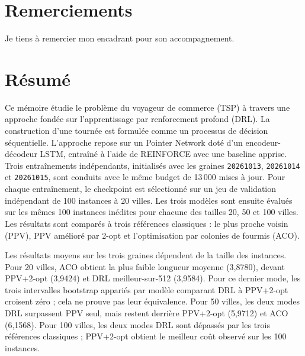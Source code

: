 \documentclass[12pt, a4paper, twoside, openright]{book}
\begin{document}
	\chapter*{Remerciements}
	\pagestyle{plain}
	Je tiens à remercier mon encadrant pour son accompagnement.
	\cleardoublepage
	
\chapter*{R\'esum\'e}

\begin{tcolorbox}[
enhanced,
colback=ThBlue!5,
colframe=ThBlue,
boxsep=2mm,
left=2mm,
right=2mm,
top=1mm,
bottom=1mm,
fontupper=\small,
]
Ce mémoire étudie le problème du voyageur de commerce (TSP) à travers
une approche fondée sur l'apprentissage par renforcement profond (DRL).
La construction d'une tournée est formulée comme un processus de décision
séquentielle. L'approche repose sur un Pointer Network doté d'un
encodeur-décodeur LSTM, entraîné à l'aide de REINFORCE avec une baseline
apprise. Trois entraînements indépendants, initialisés avec les graines
\texttt{20261013}, \texttt{20261014} et \texttt{20261015}, sont conduits
avec le même budget de 13\,000 mises à jour. Pour chaque entraînement,
le checkpoint est sélectionné sur un jeu de validation indépendant de
100 instances à 20 villes. Les trois modèles sont ensuite évalués sur les
mêmes 100 instances inédites pour chacune des tailles 20, 50 et 100 villes.
Les résultats sont comparés à trois références classiques : le plus proche
voisin (PPV), PPV amélioré par 2-opt et l'optimisation par colonies de
fourmis (ACO).

Les résultats moyens sur les trois graines dépendent de la taille des
instances. Pour 20 villes, ACO obtient la plus faible longueur moyenne
(3,8780), devant PPV+2-opt (3,9424) et DRL meilleur-sur-512 (3,9584).
Pour ce dernier mode, les trois intervalles bootstrap appariés par modèle
comparant DRL à PPV+2-opt croisent zéro ; cela ne prouve pas leur
équivalence. Pour 50 villes, les deux modes DRL surpassent PPV seul, mais
restent derrière PPV+2-opt (5,9712) et ACO (6,1568). Pour 100 villes,
les deux modes DRL sont dépassés par les trois références classiques ;
PPV+2-opt obtient le meilleur coût observé sur les 100 instances.


\end{tcolorbox}
\end{document}
